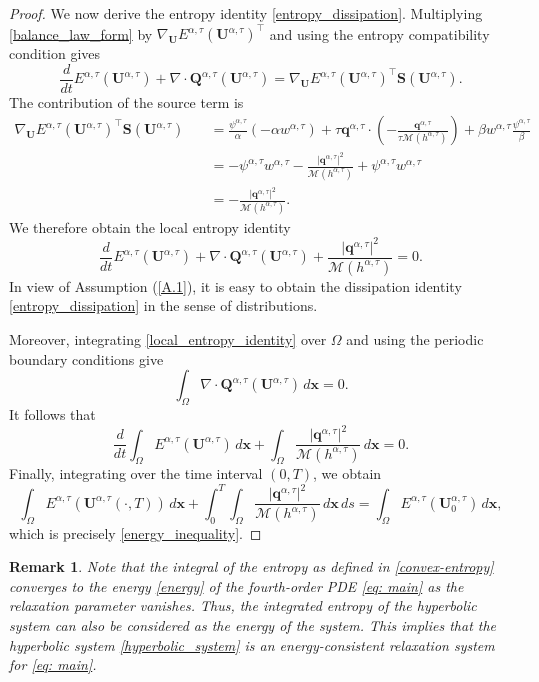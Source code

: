 \documentclass[11pt]{article}
\numberwithin{equation}{section}
\newtheorem{counter example}[theorem]{Counter Example}
\newtheorem{remark}[theorem] {Remark}
\numberwithin{equation}{section}
\numberwithin{equation}{section}
\newcommand{\rel}{^{\alpha, \tau}}
\begin{document}
\begin{proof}
We now derive the entropy identity \eqref{entropy_dissipation}. Multiplying
\eqref{balance_law_form} by
$\nabla_{\mathbf U}E^{\alpha,\tau}(\mathbf U\rel)^\top$
and using the entropy compatibility condition gives
\[
\dfrac{d}{dt}E^{\alpha,\tau}(\mathbf U\rel)
+\nabla\cdot
\mathbf Q^{\alpha,\tau}(\mathbf U\rel)
=
\nabla_{\mathbf U}E^{\alpha,\tau}(\mathbf U\rel)^\top
\mathbf S(\mathbf U\rel).
\]
The contribution of the source term is
\begin{align*}
\nabla_{\mathbf U}E^{\alpha,\tau}(\mathbf U\rel)^\top
\mathbf S(\mathbf U\rel)&\quad=
\frac{\psi\rel}{\alpha}(-\alpha w\rel)
+\tau\mathbf q\rel\cdot
\left(
-\frac{\mathbf q\rel}
{\tau\mathcal M(h\rel)}
\right)
+\beta w\rel\frac{\psi\rel}{\beta}
\\
&\quad=
-\psi\rel w\rel
-\frac{|\mathbf q\rel|^2}{\mathcal M(h\rel)}
+\psi\rel w\rel
\\
&\quad=
-\frac{|\mathbf q\rel|^2}{\mathcal M(h\rel)}.
\end{align*}
We therefore obtain the local entropy identity
\begin{equation}\label{local_entropy_identity}
\dfrac{d}{dt}E^{\alpha,\tau}(\mathbf U\rel)
+\nabla\cdot
\mathbf Q^{\alpha,\tau}(\mathbf U\rel)
+\frac{|\mathbf q\rel|^2}{\mathcal M(h\rel)}
=0.
\end{equation}
In view of Assumption (\ref{A.1}), it is easy to obtain the dissipation identity \eqref{entropy_dissipation} in the sense of distributions. 

Moreover, integrating \eqref{local_entropy_identity} over $\Omega$ and using the
periodic boundary conditions give
\[
\int_\Omega
\nabla\cdot
\mathbf Q^{\alpha,\tau}(\mathbf U\rel)
\,d\mathbf x
=0.
\]
It follows that
\[
\frac{d}{dt}
\int_\Omega
E^{\alpha,\tau}(\mathbf U\rel)\,d\mathbf x
+
\int_\Omega
\frac{|\mathbf q\rel|^2}{\mathcal M(h\rel)}
\,d\mathbf x
=0.
\]
Finally, integrating over the time interval $(0,T)$, we obtain
\[
\int_\Omega
E^{\alpha,\tau}(\mathbf U\rel(\cdot, T))\,d\mathbf x
+
\int_0^T\int_\Omega
\frac{|\mathbf q\rel|^2}{\mathcal M(h\rel)}
\,d\mathbf x\,ds
=
\int_\Omega
E^{\alpha,\tau}(\mathbf U\rel_0)\,d\mathbf x,
\]
which is precisely \eqref{energy_inequality}.
\end{proof}
\begin{remark}
Note that the integral of the entropy as defined in \eqref{convex-entropy} converges to the energy \eqref{energy} of the fourth-order PDE \eqref{eq: main} as the relaxation parameter vanishes. Thus, the integrated entropy of the hyperbolic system can also be considered as the energy of the system. This implies that the hyperbolic system \eqref{hyperbolic_system} is an energy-consistent relaxation system for \eqref{eq: main}.
\end{remark}
\end{document}
